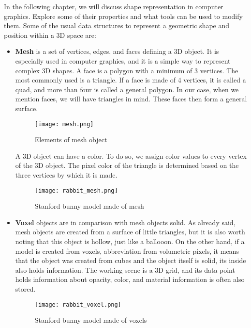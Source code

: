 
In the following chapter, we will discuss shape representation in computer graphics. Explore some of their properties and what tools can be used to modify them. Some of the usual data structures to represent a geometric shape and position within a 3D space are:

\begin{itemize}
    \item \textbf{Mesh} is a set of vertices, edges, and faces defining a 3D object. It is especially used in computer graphics, and it is a simple way to represent complex 3D shapes. A face is a polygon with a minimum of 3 vertices. The most commonly used is a triangle. If a face is made of 4 vertices, it is called a quad, and more than four is called a general polygon. In our case, when we mention faces, we will have triangles in mind. These faces then form a general surface. 
    \begin{figure}[h]
        \centering
        \texttt{[image: mesh.png]}
        \caption{Elements of mesh object \cite{stanford}}
        \label{fig:mesh}
    \end{figure}
    
    A 3D object can have a color. To do so, we assign color values to every vertex of the 3D object. The pixel color of the triangle is determined based on the three vertices by which it is made.
    
    \begin{figure}[h]
        \centering
        \texttt{[image: rabbit\_mesh.png]}
        \caption{Stanford bunny model made of mesh \cite{stanford}}
        \label{fig:rabbit_mesh}
    \end{figure}

    \item \textbf{Voxel} objects are in comparison with mesh objects solid. As already said, mesh objects are created from a surface of little triangles, but it is also worth noting that this object is hollow, just like a ballooon. On the other hand, if a model is created from voxels, abbreviation from volumetric pixels, it means that the object was created from cubes and the object itself is solid, its inside also holds information. The working scene is a 3D grid, and its data point holds information about opacity, color, and material information is often also stored.
    
    \begin{figure}[h]
        \centering
        \texttt{[image: rabbit\_voxel.png]}
        \caption{Stanford bunny model made of voxels \cite{lstmcell_img}}
        \label{fig:rabbit_voxel}
    \end{figure}


\end{itemize}
